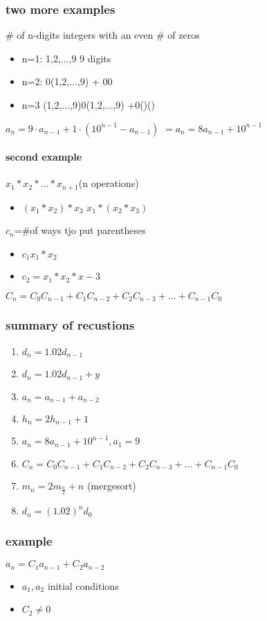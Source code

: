 \documentclass[a4paper,10pt]{article}
\begin{document}
\subsubsection{two more examples}
\# of n-digits integers with an even \# of zeros
\begin{itemize}
 \item n=1: 1,2,...,9  9 digits 
 \item n=2: 0(1,2,...,9) + 00
 \item n=3 (1,2,...,9)0(1,2,...,9) +0()()
\end{itemize}
$a_n=9\cdot a_{n-1}+1\cdot (10^{n-1}-a_{n-1})$
\newline
$=a_n=8a_{n-1}+10^{n-1}$
\paragraph{second example}
$x_1*x_2*...*x_{n+1}$(n operations)
\newline
\begin{itemize}
 \item $(x_1*x_2)*x_3$  $x_1*(x_2*x_3)$
\end{itemize}
$c_n$=\#of ways tjo put parentheses
\newline
\begin{itemize}
 \item $c_1 x_1*x_2$
 \item $c_2= x_1*x_2*x-3$
\end{itemize}
$C_n=C_0C_{n-1}+C_1C_{n-2}+C_2C_{n-3}+...+C_{n-1}C_0$
\subsubsection{summary of recustions}
\begin{enumerate}
 \item $d_n=1.02d_{n-1}$
 \item $d_n=1.02d_{n-1}+y$
 \item $a_n=a_{n-1}+a_{n-2}$
 \item $h_n=2h_{n-1}+1$
 \item $a_n=8a_{n-1}+10^{n-1},a_1=9$
 \item $C_n=C_0C_{n-1}+C_1C_{n-2}+C_2C_{n-3}+...+C_{n-1}C_0$
 \item $m_n=2m_{\frac{n}{2}}+n$ (mergesort)
 \item $d_n=(1.02)^{n}d_0$
 \end{enumerate}
\subsubsection{example}
$a_n=C_1a_{n-1}+C_2a_{n-2}$
\begin{itemize}
 \item $a_1,a_2$ initial conditions
 \item $C_2\neq 0$
\end{itemize}
\end{document}
